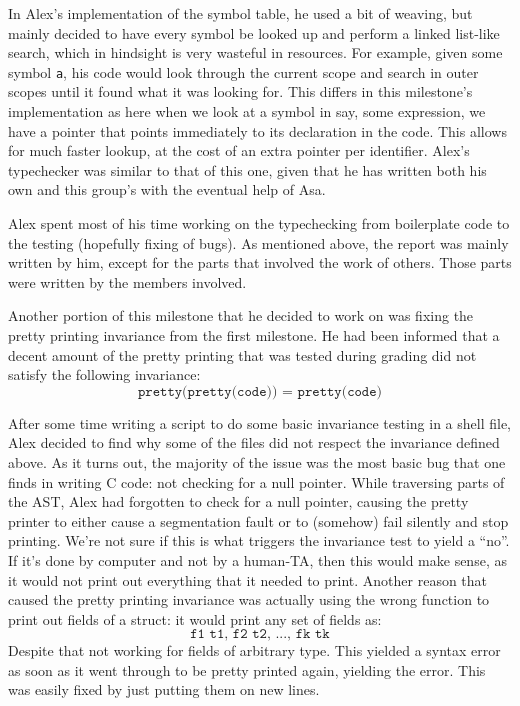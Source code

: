 \documentclass{article}
\begin{document}

In Alex's implementation of the symbol table, he used a bit of weaving, but
mainly decided to have every symbol be looked up and perform a linked list-like
search, which in hindsight is very wasteful in resources. For example,
given some symbol \verb$a$, his code would look through the current scope and
search in outer scopes until it found what it was looking for. This differs
in this milestone's implementation as here when we look at a symbol in say, some
expression, we have a pointer that points immediately to its declaration in
the code. This allows for much faster lookup, at the cost of an extra pointer
per identifier. Alex's typechecker was similar to that of this one, given
that he has written both his own and this group's with the eventual help of
Asa.

Alex spent most of his time working on the typechecking from boilerplate code
to the testing (hopefully fixing of bugs). As mentioned above, the report was
mainly written by him, except for the parts that involved the work of others.
Those parts were written by the members involved.

Another portion of this milestone that he decided to work on was fixing the pretty printing invariance from the first milestone.
He had been informed that a decent amount of the pretty printing that was tested during grading did not satisfy the following invariance:
\[
    \texttt{pretty(pretty(code)) = pretty(code)}
\]

After some time writing a script to do some basic invariance testing in a shell
file, Alex decided to find why some of the files did not respect the
invariance defined above. As it turns out, the majority of the issue was the
most basic bug that one finds in writing C code: not checking for a null pointer.
While traversing parts of the AST, Alex had forgotten to check for a null
pointer, causing the pretty printer to either cause a segmentation fault or to
(somehow) fail silently and stop printing. We're not sure if this is what
triggers the invariance test to yield a ``no''. If it's done by computer and
not by a human-TA, then this would make sense, as it would not print out everything that it needed to print. Another reason that caused the pretty
printing invariance was actually using the wrong function to print out fields
of a struct: it would print any set of fields as:
\[
    \texttt{f1 t1, f2 t2, ..., fk tk}
\]
Despite that not working for fields of arbitrary type. This yielded a syntax error as
soon as it went through to be pretty printed again, yielding the error. This was easily fixed by just putting them on new lines.
\end{document}
